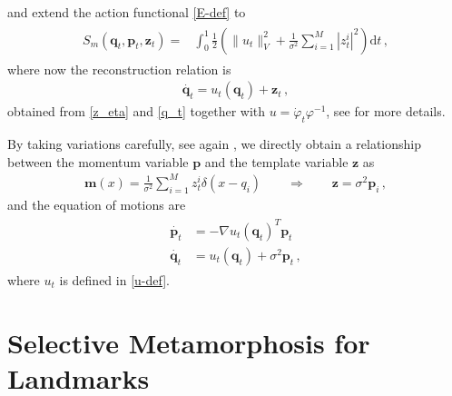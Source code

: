 \documentclass[runningheads]{llncs}
\newcommand{\half}{\frac 12}
\newcommand{\norm}[2]{\| #1 \|_{ #2 }}
\newcommand{\vnorm}[1]{\norm{ #1 }{V}}
\newcommand{\diff}[1]{\text{d} #1}
\begin{document}
and extend the action functional \eqref{E-def} to 
\begin{align}
  \begin{split}
    S_m(\mathbf q_t, \mathbf p_t, \mathbf z_t) = & \int_0^1
    \half  \left (\vnorm{u_t}^2 + \frac{1}{\sigma^2} \sum_{i=1}^M |z_t^i|^2\right )\diff{t}\, , 
  \end{split}
  \label{E_m-def}
\end{align}
where now the reconstruction relation is 
\begin{align}
    \dot{\mathbf q_t} = u_t (\mathbf q_t) + \mathbf z_t\, , 
    \label{dq-m}
\end{align}
obtained from \eqref{z_eta} and \eqref{q_t} together with  $u= \dot \varphi_t \varphi^{-1}$, 
see \cite{holm2009euler} for more details.  

By taking variations carefully, see again \cite{holm2009euler}, we directly obtain a relationship
between the momentum variable $\mathbf p$ and the template variable $\mathbf z$ as
\begin{align}
  \mathbf m(x) = \frac{1}{\sigma^2} \sum_{i=1}^M z_t^i\delta(x-q_i)\qquad \Rightarrow \qquad
  \mathbf z = \sigma^2 \mathbf p_i\, , 
\end{align}
and the equation of motions are
\begin{align}
  \begin{split}
  \dot{\mathbf p_t} &= - \nabla u_t(\mathbf q_t)^T \mathbf p_t\\ 
  \dot{\mathbf q_t} &= u_t(\mathbf q_t) +  \sigma^2\mathbf p_t \,,
  \end{split}
  \label{eq-m-classic}
\end{align}
where $u_t$ is defined in \eqref{u-def}. 


\section{Selective Metamorphosis for Landmarks}\label{sec:select_mm}
\end{document}
